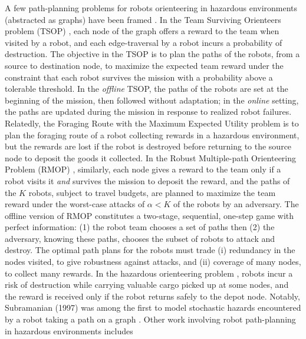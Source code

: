 \documentclass[fleqn,10pt,lineno]{wlpeerj}
\begin{document}
A few path-planning problems for robots orienteering in hazardous environments (abstracted as graphs) have been framed \cite{zhou2021multi}. 
In the Team Surviving Orienteers problem (TSOP) \cite{jorgensen2018team,jorgensen2017matroid,jorgensen2024matroid}, each node of the graph offers a reward to the team when visited by a robot, and each edge-traversal by a robot incurs a probability of destruction. 
The objective in the TSOP is to plan the paths of the robots, from a source to destination node, to maximize the expected team reward under the constraint that each robot survives the mission with a probability above a tolerable threshold. 
In the \emph{offline} TSOP, the paths of the robots are set at the beginning of the mission, then followed without adaptation; in the \emph{online} setting, the paths are updated during the mission in response to realized robot failures.
Relatedly, the Foraging Route with the Maximum Expected Utility problem \cite{di2022foraging} is to plan the foraging route of a robot collecting rewards in a hazardous environment, but the rewards are lost if the robot is destroyed before returning to the source node to deposit the goods it collected.
In the Robust Multiple-path Orienteering Problem (RMOP) \cite{shi2023robust}, similarly, each node gives a reward to the team only if a robot visits it \emph{and} survives the mission to deposit the reward, and the paths of the $K$ robots, subject to travel budgets, are planned to maximize the team reward under the worst-case attacks of $\alpha<K$ of the robots by an adversary. 
The offline version of RMOP constitutes a two-stage, sequential, one-step game with perfect information: (1) the robot team chooses a set of paths then (2) the adversary, knowing these paths, chooses the subset of robots to attack and destroy. 
The optimal path plans for the robots must trade (i) redundancy in the nodes visited, to give robustness against attacks, and (ii) coverage of many nodes, to collect many rewards.
In the hazardous orienteering problem \cite{santini2023hazardous,montemanni2025exact}, robots incur a risk of destruction while carrying valuable cargo picked up at some nodes, and the reward is received only if the robot returns safely to the depot node.
Notably, Subramanian (1997) was among the first to model stochastic hazards encountered by a robot taking a path on a graph \cite{sherali1997low}.
Other work involving robot path-planning in hazardous environments includes 
\end{document}
